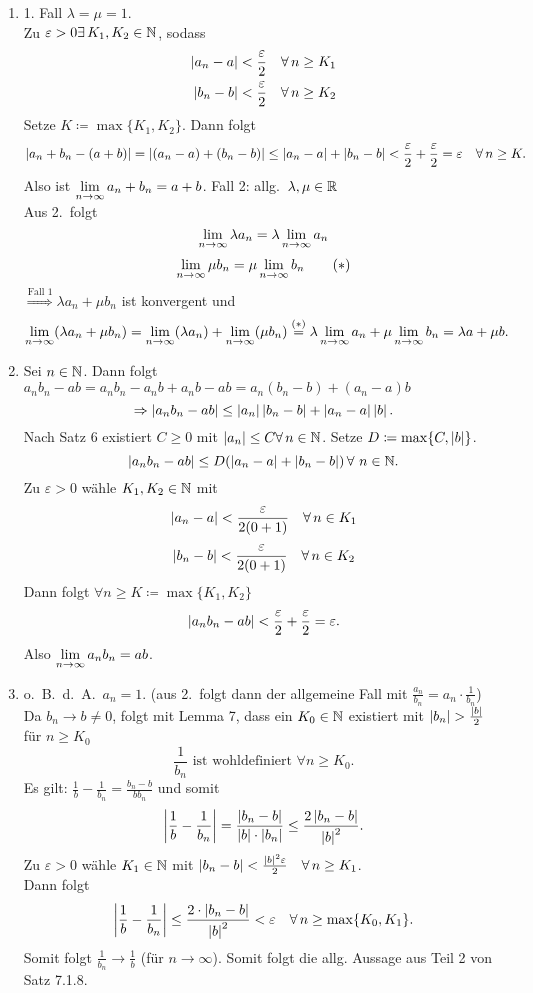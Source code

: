 \documentclass[../ana1.tex]{subfiles}
\begin{document}
\begin{bew}\leavevmode
	\begin{enumerate}
		\item 1. Fall \(\lambda = \mu = 1 \).\\
		Zu \(\varepsilon>0 \exists K_1, K_2 \in\N \), sodass
		\begin{align*}
			\abs{a_n-a}<\frac{\varepsilon}{2} \quad \forall n\geq K_1\\
			\abs{b_n-b}<\frac{\varepsilon}{2} \quad \forall n\geq K_2
		\end{align*}
		Setze \(K \coloneqq \max \{K_1, K_2\} \). Dann folgt
		\[\abs{a_n + b_n - (a+b)} = \abs{(a_n-a)+(b_n-b)} \leq \abs{a_n-a}+\abs{b_n-b} < \frac{\varepsilon}{2} + \frac{\varepsilon}{2} = \varepsilon \quad \forall n\geq K. \]
		Also ist \(\lim\limits_{n\rightarrow\infty}a_n+b_n=a+b \).
		Fall 2: allg.\  \(\lambda,\mu\in\mathbb{R} \) \\
		Aus 2.\ folgt
		\[\lim\limits_{n\rightarrow\infty} \lambda a_n = \lambda \lim\limits_{n\rightarrow\infty} a_n \]
		\[\lim\limits_{n\rightarrow\infty} \mu b_n = \mu \lim\limits_{n\rightarrow\infty} b_n \qquad(*) \]
		\(\overset{\text{Fall 1}}{\Rightarrow} \lambda a_n + \mu b_n \) ist konvergent und
		\[\lim\limits_{n\rightarrow\infty} (\lambda a_n + \mu b_n) = \lim\limits_{n\rightarrow\infty} (\lambda a_n) + \lim\limits_{n\rightarrow\infty} (\mu b_n) \overset{(*)}{=} \lambda \lim\limits_{n\rightarrow\infty} a_n + \mu \lim\limits_{n\rightarrow\infty} b_n = \lambda a + \mu b. \]
		\item Sei \(n\in\mathbb{N} \). Dann folgt \(a_n b_n-ab = a_n b_n -a_n b + a_n b - ab=a_n(b_n-b)+(a_n-a)b \)
		\[\Rightarrow \left|a_n b_n -ab\right|\leq \left|a_n\right| \left|b_n-b\right| + \left|a_n-a\right|\left|b\right|. \]
		Nach Satz 6 existiert \(C\geq 0 \) mit \(\abs{a_n}\leq C \forall n\in\N \). Setze \(D\coloneqq \max \{C, \left|b\right|\} \).
		\[\abs{a_n b_n - ab} \leq D(\abs{a_n-a}+\abs{b_n-b}) \,\forall \, n\in\N. \]
		Zu \(\varepsilon > 0 \) wähle \(K_1,K_2\in\mathbb{N} \) mit
		\[\abs{a_n-a}<\frac{\varepsilon}{2(0+1)} \quad \forall n\in K_1 \]
		\[\abs{b_n-b}<\frac{\varepsilon}{2(0+1)} \quad \forall n\in K_2 \]
		Dann folgt \(\forall n\geq K \coloneqq \max \{K_1, K_2\} \)
		\[\left|a_n b_n - ab\right|<\frac{\varepsilon}{2} + \frac{\varepsilon}{2} = \varepsilon. \]
		Also \(\lim\limits_{n\rightarrow\infty} a_n b_n = ab \).
		\item o.\ B.\ d.\ A.\  \(a_n = 1 \). (aus 2.\ folgt dann der allgemeine Fall mit \( \frac{a_n}{b_n} = a_n \cdot\frac{1}{b_n} \))\\
		Da \(b_n \rightarrow b \neq 0 \), folgt mit Lemma 7, dass ein \(K_0\in\mathbb{N} \) existiert mit \(\left|b_n\right| >\frac{\left|b\right|}{2} \) für \(n\geq K_0 \)
		\[\frac{1}{b_n} \text{ ist wohldefiniert } \forall n\geq K_0. \]
		Es gilt: \( \frac{1}{b} - \frac{1}{b_n} = \frac{b_n - b}{b b_n} \) und somit
		\[ \left| \frac{1}{b} - \frac{1}{b_n}\right| = \frac{\left|b_n-b\right|}{\left|b\right| \cdot \left|b_n\right|} \leq \frac{2 \left|b_n - b\right|}{\left|b\right|^2}. \]
		Zu \(\varepsilon >0 \) wähle \(K_1 \in \mathbb{N} \) mit \(\abs{b_n - b} < \frac{\abs{b}^2\varepsilon}{2} \quad \forall n\geq K_1 \).\\
		Dann folgt
		\[ \abs{ \frac{1}{b} - \frac{1}{b_n}} \leq \frac{2 \cdot \abs{b_n - b}}{\abs{b}^2} < \varepsilon \quad \forall n\geq\max \{ K_0,K_1\}. \]
		Somit folgt \( \frac{1}{b_n} \rightarrow \frac{1}{b} \) (für \(n\rightarrow \infty \)). Somit folgt die allg. Aussage aus Teil 2 von Satz 7.1.8.
	\end{enumerate}
\end{bew}
\end{document}
